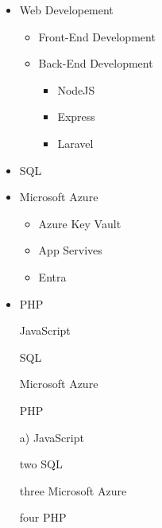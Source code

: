 \documentclass[11pt]{article}
\begin{document}
\begin{itemize}
  \item Web Developement
    \begin{itemize}
      \item Front-End Development
      \item Back-End Development
        \begin{itemize}
          \item NodeJS
          \item Express
          \item Laravel
        \end{itemize}
    \end{itemize}
  \item SQL
  \item Microsoft Azure
    \begin{itemize}
      \item Azure Key Vault
      \item App Servives
      \item Entra
    \end{itemize}
  \item PHP
\end{itemize}

\vspace{1cm}

\begin{enumerate}
  \item[] JavaScript
  \item[] SQL
  \item[] Microsoft Azure
  \item[] PHP
\end{enumerate}

\vspace{1cm}

\begin{enumerate}
  \item[a)] JavaScript
  \item[two] SQL
  \item[three] Microsoft Azure
  \item[four] PHP
\end{enumerate}
\end{document}
